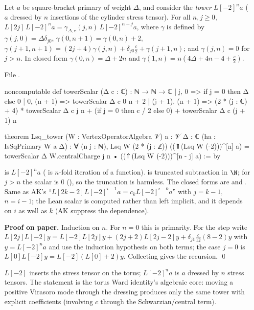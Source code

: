 \begin{theorem}\label{l16:thm:tower}
Let $a$ be square-bracket primary of weight $\Delta$, and consider the \emph{tower} $L[-2]^na$ ($a$ dressed by $n$ insertions
of the cylinder stress tensor). For all $n,j\ge0$,
$L[2j]\,L[-2]^n a = \gamma_{\Delta,c}(j,n)\,L[-2]^{n-j}a$, where $\gamma$ is defined by $\gamma(j,0) = \Delta\delta_{j0}$,
$\gamma(0,n+1) = \gamma(0,n)+2$, $\gamma(j+1,n+1) = (2j+4)\gamma(j,n) + \delta_{j0}\frac c2 + \gamma(j+1,n)$; and
$\gamma(j,n) = 0$ for $j>n$. In closed form $\gamma(0,n) = \Delta+2n$ and $\gamma(1,n) = n(4\Delta+4n-4+\frac c2)$.
\end{theorem}
\noindent File .
\begin{leancode}
noncomputable def towerScalar (Δ c : ℂ) : ℕ → ℕ → ℂ
  | j, 0 => if j = 0 then Δ else 0
  | 0, (n + 1) => towerScalar Δ c 0 n + 2
  | (j + 1), (n + 1) =>
      (2 * (j : ℂ) + 4) * towerScalar Δ c j n
        + (if j = 0 then c / 2 else 0) + towerScalar Δ c (j + 1) n

theorem Lsq_tower (W : VertexOperatorAlgebra 𝒱) {a : 𝒱} {Δ : ℂ} (ha : IsSqPrimary W a Δ) :
    ∀ (n j : ℕ), Lsq W (2 * (j : ℤ)) ((⇑(Lsq W (-2)))^[n] a)
      = towerScalar Δ W.centralCharge j n • ((⇑(Lsq W (-2)))^[n - j] a) := by
\end{leancode}

\begin{dictionary}
 is $L[-2]^na$ (\lean{^[n]} is $n$-fold iteration of a function).  is truncated
subtraction in $\N$; for $j>n$ the scalar is $0$ (\allowbreak{}\allowbreak{}), so the truncation is harmless.
The closed forms are  and . Same as AK's
``$L[2k-2]L[-2]^{i-1}a = c_kL[-2]^{i-k}a$'' with $j = k-1$, $n = i-1$; the Lean scalar is computed rather than left
implicit, and it depends on $i$ as well as $k$ (AK suppress the dependence).
\end{dictionary}

\textbf{Proof on paper.} Induction on $n$. For $n=0$ this is primarity. For the step write
$L[2j]L[-2]y = L[-2]L[2j]y + (2j+2)L[2j-2]y + \delta_{j1}\frac{c}{12}(8-2)y$ with $y = L[-2]^na$ and use the induction
hypothesis on both terms; the case $j=0$ is $L[0]L[-2]y = L[-2](L[0]+2)y$. Collecting gives the recursion. \qed

\begin{physics}
$L[-2]$ inserts the stress tensor on the torus; $L[-2]^na$ is $a$ dressed by $n$ stress tensors. The statement is the
torus Ward identity's algebraic core: moving a positive Virasoro mode through the dressing produces only the same
tower with explicit coefficients (involving $c$ through the Schwarzian/central term).
\end{physics}

